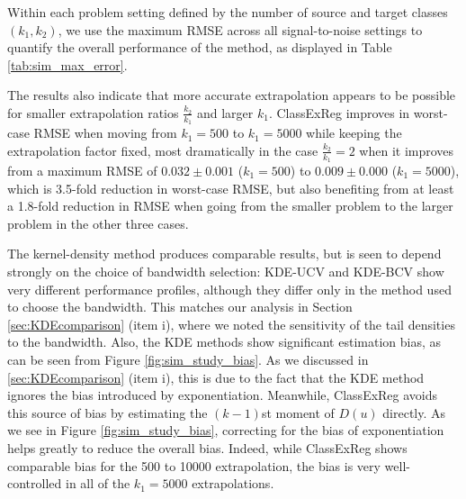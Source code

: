 \documentclass[twoside,11pt]{article}
\begin{document}
Within each problem setting defined by the number of
source and target classes $(k_1,k_2)$, we use the maximum RMSE across
all signal-to-noise settings to quantify the overall performance of
the method, as displayed in Table \ref{tab:sim_max_error}.

The results also indicate that more accurate extrapolation
appears to be possible for smaller extrapolation ratios
$\frac{k_2}{k_1}$ and larger $k_1$.
ClassExReg improves in worst-case RMSE when moving from $k_1 =500$ to $k_1 = 5000$ while keeping the extrapolation factor fixed, most dramatically in the case $\frac{k_2}{k_1} = 2$ when it improves from a
maximum RMSE of $0.032\pm0.001$ ($k_1 = 500$) to $0.009 \pm 0.000$ ($k_1 = 5000$), which is 3.5-fold reduction in worst-case RMSE, but
also benefiting from at least a 1.8-fold reduction in RMSE when going from
the smaller problem to the larger problem in the other three cases.

The kernel-density method produces comparable results, but is seen to depend strongly on the choice of bandwidth selection: KDE-UCV and KDE-BCV show very different performance profiles, although they differ only in the method used to choose the bandwidth.  This matches our analysis in Section \ref{sec:KDEcomparison} (item i), where we noted the sensitivity of the tail densities to the bandwidth.
Also, the KDE methods show significant estimation bias, as can be seen from Figure \ref{fig:sim_study_bias}.
As we discussed in \ref{sec:KDEcomparison} (item i), this is due to the fact that
the KDE method ignores the bias introduced by exponentiation.
Meanwhile, ClassExReg avoids this source of
bias by estimating the $(k-1)$st moment of $D(u)$ directly.  As we see
in Figure \ref{fig:sim_study_bias}, correcting for the bias of
exponentiation helps greatly to reduce the overall bias.   Indeed, while
ClassExReg shows comparable bias for the 500 to 10000 extrapolation,
the bias is very well-controlled in all of the $k_1 = 5000$ extrapolations.




\end{document}
